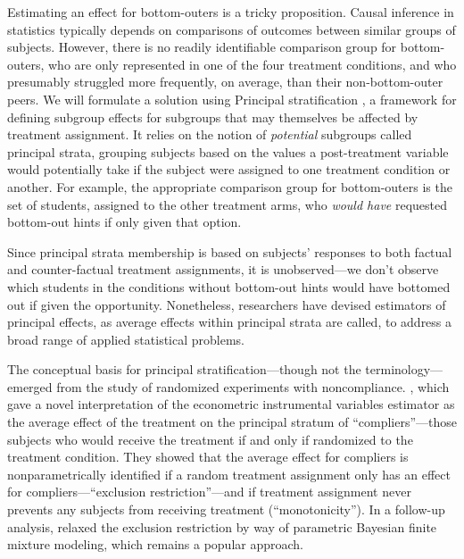 \documentclass[]{article}
\begin{document}
Estimating an effect for bottom-outers is a tricky proposition.
Causal inference in statistics typically depends on comparisons of outcomes between similar groups of subjects. However, there is no readily identifiable comparison group for bottom-outers, who are only represented in one of the four treatment conditions, and who presumably struggled more frequently, on average, than their non-bottom-outer peers.
We will formulate a solution using Principal stratification \citep{frangakis}, a  framework for defining subgroup effects for subgroups that may themselves be affected by treatment assignment. It relies on the notion of \emph{potential} subgroups called principal strata, grouping subjects based on the values a post-treatment variable would potentially take if the subject were assigned to one treatment condition or another.
For example, the appropriate comparison group for bottom-outers is the set of students, assigned to the other treatment arms, who \emph{would have} requested bottom-out hints if only given that option.

Since principal strata membership is based on subjects' responses to both factual and counter-factual treatment assignments, it is unobserved---we don't observe which students in the conditions without bottom-out hints would have bottomed out if given the opportunity.
Nonetheless, researchers have devised estimators of principal effects, as average effects within principal strata are called, to address a broad range of applied statistical problems.

The conceptual basis for principal stratification---though not the terminology---emerged from the study of randomized experiments with noncompliance. \citet{air}, which gave a novel interpretation of the econometric instrumental variables estimator as the average effect of the treatment on the principal stratum of ``compliers''---those subjects who would receive the treatment if and only if randomized to the treatment condition. They showed that the average effect for compliers is nonparametrically identified if a random treatment assignment only has an effect for compliers---``exclusion restriction''---and if treatment assignment never prevents any subjects from receiving treatment (``monotonicity'').
In a follow-up analysis, \citet{imbens1997bayesian} relaxed the exclusion restriction by way of parametric Bayesian finite mixture modeling, which remains a popular approach.
\end{document}
